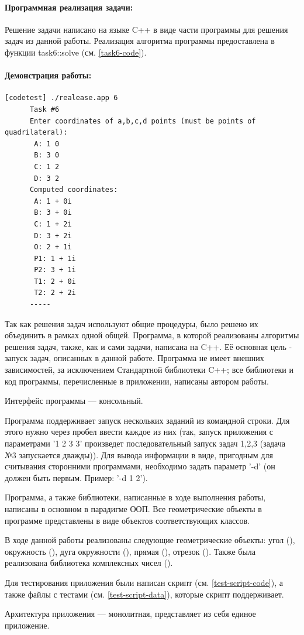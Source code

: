 {   \paragraph{Программная реализация задачи:} Решение задачи написано на языке C++ в виде части
   программы для решения задач из данной работы.
   Реализация алгоритма программы предоставлена в функции task6::solve (см. \ref{task6-code}).
   \paragraph{Демонстрация работы:}
   \vphantom{code}
   \begin{lstlisting}[language={},frame=none]
      [codetest] ./realease.app 6
      Task #6
      Enter coordinates of a,b,c,d points (must be points of quadrilateral):
       A: 1 0
       B: 3 0
       C: 1 2
       D: 3 2
      Computed coordinates:
       A: 1 + 0i
       B: 3 + 0i
       C: 1 + 2i
       D: 3 + 2i
       O: 2 + 1i
       P1: 1 + 1i
       P2: 3 + 1i
       T1: 2 + 0i
       T2: 2 + 2i
      -----
   \end{lstlisting}
}
{
   Так как решения задач используют общие процедуры, было решено их объединить в рамках одной общей.
   Программа, в которой реализованы алгоритмы решения задач, также, как и сами задачи, написана на C++. Её основная цель - запуск задач, описанных в данной работе. Программа не имеет внешних зависимостей, за исключением Стандартной библиотеки C++; все библиотеки и код программы, перечисленные в приложении, написаны автором работы.

   Интерфейс программы --- консольный.

   Программа поддерживает запуск нескольких заданий из командной строки. Для этого нужно через
   пробел ввести каждое из них (так, запуск приложения с параметрами '1 2 3 3' произведет
   последовательный запуск задач 1,2,3 (задача №3 запускается дважды)). Для вывода информации
   в виде, пригодным для считывания сторонними программами, необходимо задать параметр '-d'
   (он должен быть первым. Пример: '-d 1 2').

   Программа, а также библиотеки, написанные в ходе выполнения работы, написаны в основном в парадигме ООП. Все геометрические объекты в программе представлены в виде объектов соответствующих классов.

   В ходе данной работы реализованы следующие геометрические объекты: угол (), окружность (), дуга окружности (), прямая (), отрезок (). Также была реализована библиотека комплексных чисел ().

   Для тестирования приложения были написан скрипт (см. \ref{test-script-code}), а также файлы с тестами (см. \ref{test-script-data}), которые скрипт поддерживает.

   Архитектура приложения --- монолитная, представляет из себя единое приложение.
}
